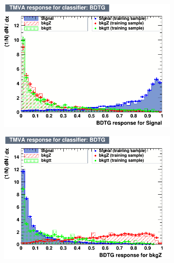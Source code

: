 \begin{figure}[!htbp]
  \centering
  
  \begin{subfigure}[b]{0.495\textwidth}
    \centering
    \includegraphics[width=\linewidth]{images/plots_overtrain_gt200/overtrain_Signal_BDTG.png}

    \label{fig:overtrain_signal_highpt}
  \end{subfigure}
  
  \vskip0.2cm %
  
  \begin{subfigure}[b]{0.495\textwidth}
    \centering
    \includegraphics[width=\linewidth]{images/plots_overtrain_gt200/overtrain_bkgZ_BDTG.png}


\end{subfigure}
\end{figure}

